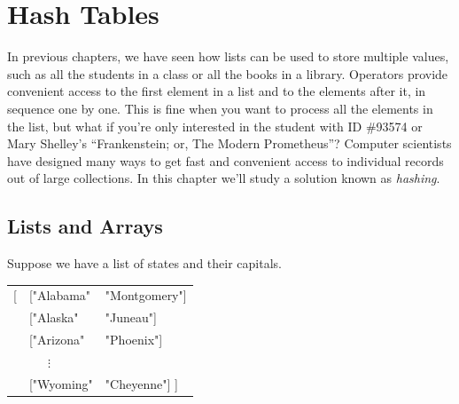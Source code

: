 \chapter{Hash Tables}
\label{ch:hash-tables}

In previous chapters, we have seen how lists can be used to store
multiple values, such as all the students in a class or all the books
in a library. Operators provide convenient access to the first element
in a list and to the elements after it, in sequence one by one.
This is fine when you want to
process all the elements in the list, but what if you're only interested
in the student with ID \#93574 or Mary Shelley's ``Frankenstein; or,
The Modern Prometheus''?
Computer scientists have designed many
ways to get fast and convenient access
to individual records out of large collections.
In this chapter we'll study a solution known as \emph{hashing}.

\section{Lists and Arrays}

Suppose we have a list of states and their
\label{states-capitals-list}capitals.
\begin{center}
\begin{tabular}{lll}
\textsf{[} &\textsf{["Alabama"}  &\textsf{"Montgomery"]}\\
  &\textsf{["Alaska"}   &\textsf{"Juneau"]}\\
  &\textsf{["Arizona"}  &\textsf{"Phoenix"]}\\
  &~~~$\vdots$     &\\
  &\textsf{["Wyoming"}  &\textsf{"Cheyenne"] ]}\\
\end{tabular}
\end{center}

